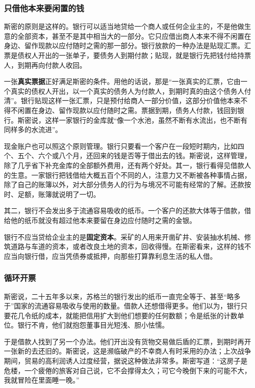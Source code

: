\subsubsection{只借他本来要闲置的钱}
斯密的原则是这样的。银行可以适当地贷给一个商人或任何企业主的，不是他做生意的全部资本，甚至不是其中相当大的一部分。它只应借出商人本来不得不闲置在身边、留作现款以应付随时之需的那一部分\cite{smith1776}。银行放款的一种办法是贴现汇票。汇票是债权人开出的一张单子，要债务人到期付款；贴现，就是银行先把钱付给持票人，到期再向付款人收回。

一张\textbf{真实票据}正好满足斯密的条件。用他的话说，那是“一张真实的汇票，它由一个真实的债权人开出，以一个真实的债务人为付款人，到期时真的由这个债务人付清”。银行贴现这样一张汇票，只是预付给商人一部分价值，这部分价值他本来不得不闲置在身边、留作现款以应付随时之需\cite{smith1776}。票据到期，债务人付款，钱回到银行。斯密说，这样一家银行的金库就“像一个水池，虽然不断有水流出，也不断有同样多的水流进”\cite{smith1776}。

现金账户也可以照这个原则管理。银行只要看一个客户在一段短时期内，比如四个、五个、六个或八个月，还回来的钱是否等于借出去的钱\cite{smith1776}。斯密说，这样管理，除了几乎省下补充金库的全部额外费用，还有两个好处。其一，银行看得见借款人的生意。一家银行把钱借给大概五百个不同的人，注意力又不断被各种事情占据，除了自己的账簿以外，对大部分债务人的行为与境况不可能有经常的了解\cite{smith1776}。还款按时、足额，账簿就说明了一切。

其二，银行不会发出多于流通容易吸收的纸币。一个客户的还款大体等于借款，借给他的纸币就没有超过他本来要留在身边应付随时之需的金银\cite{smith1776}。

银行不应当贷给企业主的是\textbf{固定资本}。采矿的人用来开凿矿井、安装抽水机械、修筑道路与车道的资本，或者改良土地的资本，回收得慢。在斯密看来，这样的钱不应当向银行借，应当凭债券或抵押，向那些打算靠利息生活的私人借\cite{smith1776}。

\subsubsection{循环开票}
斯密说，二十五年多以来，苏格兰的银行发出的纸币一直完全等于、甚至“略多于”国家的流通容易吸收与使用的数量\cite{smith1776}。借款人还想借得更多。他们以为，银行只要花几令纸的成本，就能把信用扩大到他们想要的任何数额；令是纸张的计数单位。银行不肯，他们就抱怨董事目光短浅、胆小怯懦\cite{smith1776}。

于是借款人找到了另一个办法。他们开出没有货物交易做后盾的汇票，到期时再开一张新的去还旧的。斯密说，这是濒临破产的不幸商人有时采用的办法；上次战争期间，贸易的高利润诱人过度经营，据说这种做法非常多\cite{smith1776}。斯密写道：“这房子是危楼，一个疲倦的旅客对自己说，它不会撑得太久；可它今晚倒下来的可能不大，我就冒险在里面睡一晚。”\cite{smith1776}

